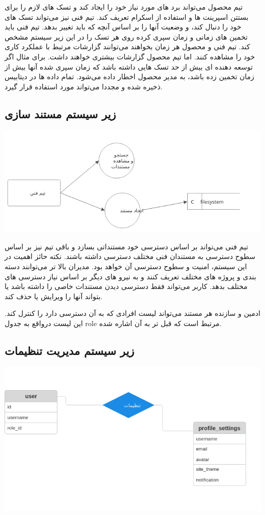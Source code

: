 تیم محصول می‌تواند برد های مورد نیاز خود را ایجاد کند و تسک های لازم را برای بستتن اسپرینت ها و استفاده از اسکرام تعریف کند.
تیم فنی نیز می‌تواند تسک های خود را دنبال کند، و وضعیت آنها را بر اساس آنچه که باید تغییر بدهد. تیم فنی باید تخمین های زمانی و زمان سپری کرده روی هر تسک را 
در این زیر سیستم مشخص کند.
تیم فنی و محصول هر  زمان بخواهند می‌توانند گزارشات مرتبط با عملکرد کاری خود را مشاهده کنند.
اما تیم محصول گزارشات بیشتری خواهند داشت.
برای مثال اگر توسعه دهنده ای بیش از حد تسک هایی داشته باشد که زمان سپری شده آنها بیش از زمان تخمین زده باشد، به مدیر محصول اخطار داده می‌شود.
تمام داده ها در دیتابیس ذخیره شده و مجددا می‌تواند مورد استفاده قرار گیرد.

\subsection{زیر سیستم مستند سازی}
\includegraphics[scale=0.8]{assets/doc_dfd.png}

تیم فنی می‌تواند بر اساس دسترسی خود مستنداتی بسازد و باقی تیم نیز بر اساس سطوح دسترسی به مستندان فنی مختلف دسترسی داشته باشند.
نکته حائز اهمیت در این سیستم، امنیت و سطوح دسترسی آن خواهد بود. مدیران بالا تر می‌توانند دسته بندی و پروژه های مختلف تعریف کنند و به نیرو های دیگر
بر اساس نیاز دسترسی های مختلف بدهد.
کاربر می‌تواند فقط دسترسی دیدن مستندات خاصی را داشته باشد یا بتواند آنها را ویرایش یا حذف کند.

ادمین و سازنده هر مستند می‌تواند لیست افرادی که به آن دسترسی دارد را کنترل کند. این لیست درواقع به جدول role مرتبط است که قبل تر به آن اشاره شده.

\subsection{زیر سیستم مدیریت تنظیمات}
\includegraphics[scale=0.8]{assets/settings_erd.png}

